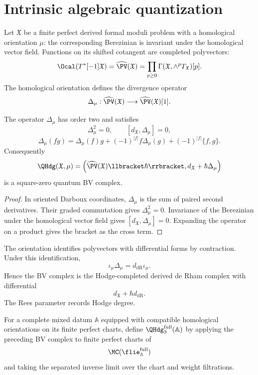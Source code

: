 \chapter{Intrinsic algebraic quantization}
Let $\mathfrak X$ be a finite perfect derived formal moduli problem with a homological orientation $\mu$: the corresponding Berezinian is invariant under the homological vector field.  Functions on its shifted cotangent are completed polyvectors:
\[
 \Ocal(T^*[-1]\mathfrak X)
 =\widehat{\PV}(\mathfrak X)
 =\prod_{p\ge0}\Gamma(\mathfrak X,\wedge^pT_{\mathfrak X})[p].
\]
The homological orientation defines the divergence operator
\[
 \Delta_\mu:\widehat{\PV}(\mathfrak X)
 \longrightarrow\widehat{\PV}(\mathfrak X)[1].
\]

\begin{theorem}
The operator $\Delta_\mu$ has order two and satisfies
\[
 \Delta_\mu^2=0,
 \qquad
 [d_{\mathfrak X},\Delta_\mu]=0,
\]
\[
 \Delta_\mu(fg)=\Delta_\mu(f)g+(-1)^{|f|}f\Delta_\mu(g)
 +(-1)^{|f|}\{f,g\}.
\]
Consequently
\[
 \QHdg(\mathfrak X,\mu)
 =\left(\widehat\PV(\mathfrak X)\llbracket\hbar\rrbracket,
 d_{\mathfrak X}+\hbar\Delta_\mu\right)
\]
is a square-zero quantum BV complex.
\end{theorem}
\begin{proof}
In oriented Darboux coordinates, $\Delta_\mu$ is the sum of paired second derivatives.  Their graded commutation gives $\Delta_\mu^2=0$.  Invariance of the Berezinian under the homological vector field gives $[d_{\mathfrak X},\Delta_\mu]=0$.  Expanding the operator on a product gives the bracket as the cross term.
\end{proof}

The orientation identifies polyvectors with differential forms by contraction.  Under this identification,
\[
 \iota_\mu\Delta_\mu=d_{\mathrm{dR}}\iota_\mu.
\]
Hence the BV complex is the Hodge-completed derived de Rham complex with differential
\[
 d_{\mathfrak X}+\hbar d_{\mathrm{dR}}.
\]
The Rees parameter records Hodge degree.

\begin{definition}
For a complete mixed datum $\mathbb A$ equipped with compatible homological orientations on its finite perfect charts, define $\QHdg_3^{\mathrm{full}}(\mathbb A)$ by applying the preceding BV complex to finite perfect charts of
\[
 \MC(\flie_{\mathbb A}^{\mathrm{full}})
\]
and taking the separated inverse limit over the chart and weight filtrations.
\end{definition}

